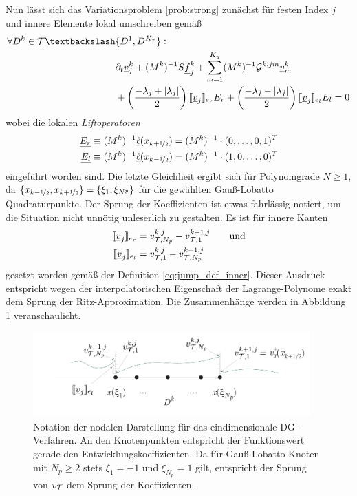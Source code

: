 Nun lässt sich das Variationsproblem \ref{prob:strong} zunächst für festen Index $j$ und innere Elemente lokal umschreiben gemäß
\begin{equation}
  \begin{aligned}
    \forall D^k\in\mathcal{T} \textbackslash &\{D^1,D^{K_x}\} : \\
      &\partial_t \underline{v}_j^k + (M^k)^{-1}S \underline{f}_j^k + \sum_{m=1}^{K_y} (M^k)^{-1}\drift^{k,jm}\underline{v}_m^k \\
      &+ \left(\frac{-\lambda_j + |\lambda_j|}{2}\right) \jump{\underline{v}_j}_{e_r}\underline{E_r} +
         \left(\frac{-\lambda_j - |\lambda_j|}{2}\right) \jump{\underline{v}_j}_{e_l}\underline{E_l} = 0
  \end{aligned}
  \label{eq:schema1}
\end{equation}
wobei die lokalen \emph{Liftoperatoren}
\begin{equation}
  \begin{aligned}
    \underline{E_r} &\equiv (M^k)^{-1}\underline{\ell}(x_{k+\nicefrac{1}{2}}) = (M^k)^{-1}  \cdot (0,\dots,0,1)^T \\
    \underline{E_l} &\equiv (M^k)^{-1}\underline{\ell}(x_{k-\nicefrac{1}{2}}) = (M^k)^{-1}  \cdot (1,0,\dots,0)^T
  \end{aligned}
\end{equation}
eingeführt worden sind. Die letzte Gleichheit ergibt sich für Polynomgrade $N\geq{1}$, da ${ \{x_{k-\nicefrac{1}{2}}, x_{k+\nicefrac{1}{2}}\} = \{\xi_1, \xi_{N^p} \} }$ für die gewählten Gauß-Lobatto Quadraturpunkte. Der Sprung der Koeffizienten ist etwas fahrlässig notiert, um die Situation nicht unnötig unleserlich zu gestalten. Es ist für innere Kanten
\begin{align*}
  \llbracket \underline{v}_j \rrbracket_{e_r} &= v_{\mathcal{T},N_p}^{k,j} - v_{\mathcal{T},1}^{k+1,j} \qquad \text{und} \\
  \llbracket \underline{v}_j \rrbracket_{e_l} &= v_{\mathcal{T},1}^{k,j} - v_{\mathcal{T},N_p}^{k-1,j}
\end{align*}
gesetzt worden gemäß der Definition \eqref{eq:jump_def_inner}. Dieser Ausdruck entspricht wegen der interpolatorischen Eigenschaft der Lagrange-Polynome exakt dem Sprung der Ritz-Approximation. Die Zusammenhänge werden in Abbildung \ref{fig:notationDG2} veranschaulicht.
\begin{figure}
  \centering
  \includegraphics[width=0.95\textwidth]{files/notationDG2.pdf}
  \caption{Notation der nodalen Darstellung für das eindimensionale DG-Verfahren. An den Knotenpunkten entspricht der Funktionswert gerade den Entwicklungskoeffizienten. Da für Gauß-Lobatto Knoten mit $N_p\geq 2$ stets $\xi_1=-1$ und $\xi_{N_p}=1$ gilt, entspricht der Sprung von $v_{\mathcal{T}}$ dem Sprung der Koeffizienten.}
  \label{fig:notationDG2}
\end{figure}

